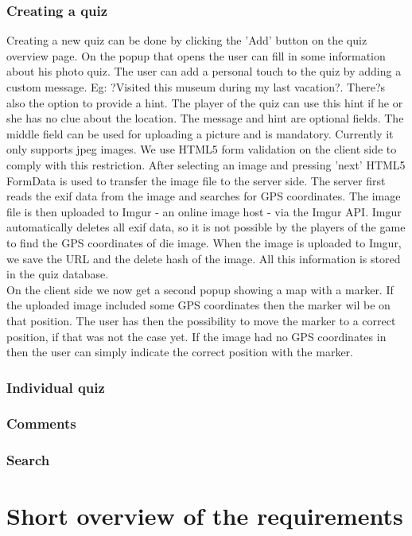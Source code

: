 \documentclass[11pt, oneside]{article}   	%
\begin{document}
\subsubsection{Creating a quiz}
Creating a new quiz can be done by clicking the 'Add' button on the quiz overview page. On the popup that opens the user can fill in some information about his photo quiz. The user can add a personal touch to the quiz by adding a custom message. Eg: ?Visited this museum during my last vacation?. There?s also the option to provide a hint. The player of the quiz can use this hint if he or she has no clue about the location. The message and hint are optional fields. The middle field can be used for uploading a picture and is mandatory. Currently it only supports jpeg images. We use HTML5 form validation on the client side to comply with this restriction. 
After selecting an image and pressing 'next' HTML5 FormData is used to transfer the image file to the server side. The server first reads the exif data from the image and searches for GPS coordinates. The image file is then uploaded to Imgur - an online image host - via the Imgur API. Imgur automatically deletes all exif data, so it is not possible by the players of the game to find the GPS coordinates of die image. When the image is uploaded to Imgur, we save the URL and the delete hash of the image. All this information is stored in the quiz database. \\
On the client side we now get a second popup showing a map with a marker. If the uploaded image included some GPS coordinates then the marker wil be on that position. The user has then the possibility to move the marker to a correct position, if that was not the case yet. If the image had no GPS coordinates in then the user can simply indicate the correct position with the marker. 

\subsubsection{Individual quiz}
\subsubsection{Comments}
\subsubsection{Search}


\section{Short overview of the requirements} %
\end{document}
